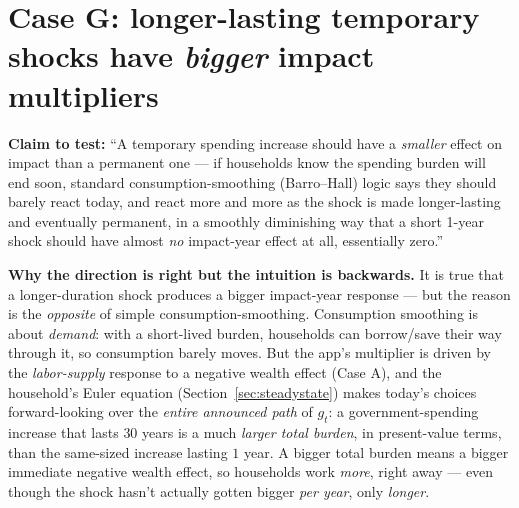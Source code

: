 \documentclass[11pt]{article}
\begin{document}
\section{Case G: longer-lasting temporary shocks have \emph{bigger} impact multipliers}
\label{sec:caseG}

\textbf{Claim to test:} ``A temporary spending increase should have a
\emph{smaller} effect on impact than a permanent one --- if households
know the spending burden will end soon, standard consumption-smoothing
(Barro--Hall) logic says they should barely react today, and react more
and more as the shock is made longer-lasting and eventually permanent, in
a smoothly diminishing way that a short 1-year shock should have almost
\emph{no} impact-year effect at all, essentially zero.''

\textbf{Why the direction is right but the intuition is backwards.} It is
true that a longer-duration shock produces a bigger impact-year response
--- but the reason is the \emph{opposite} of simple consumption-smoothing.
Consumption smoothing is about \emph{demand}: with a short-lived burden,
households can borrow/save their way through it, so consumption barely
moves. But the app's multiplier is driven by the \emph{labor-supply}
response to a negative wealth effect (Case A), and the household's
Euler equation (Section~\ref{sec:steadystate}) makes today's choices
forward-looking over the \emph{entire announced path} of $g_t$: a
government-spending increase that lasts $30$ years is a much
\emph{larger total burden}, in present-value terms, than the same-sized
increase lasting $1$ year. A bigger total burden means a bigger
immediate negative wealth effect, so households work \emph{more}, right
away --- even though the shock hasn't actually gotten bigger \emph{per
year}, only \emph{longer}.
\end{document}

